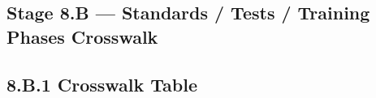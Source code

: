 \documentclass[10pt]{article}
\begin{document}
\begin{landscape}
\section*{Stage 8.B — Standards / Tests / Training Phases Crosswalk}
{}

\subsection*{8.B.1 Crosswalk Table}
{}

\begingroup
\scriptsize
\setlength{\tabcolsep}{2pt}
\renewcommand{\arraystretch}{1.10}


\end{landscape}
\end{document}
